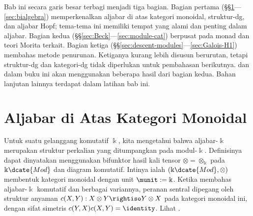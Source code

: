 \begin{petunjukbacaan}
	Bab ini secara garis besar terbagi menjadi tiga bagian. Bagian pertama
(\S\S\ref{sec:alg-in-monoidal-cat}---\ref{sec:bialgebra}) memperkenalkan aljabar
	di atas kategori monoidal, struktur-dg, dan aljabar Hopf; tema-tema ini
	memiliki tempat yang alami dan penting dalam aljabar. Bagian kedua
	(\S\S\ref{sec:Beck}---\ref{sec:module-cat}) berpusat pada monad dan teori
	Morita terkait. Bagian ketiga
	(\S\S\ref{sec:descent-modules}---\ref{sec:Galois-H1}) membahas metode
	penurunan. Ketiganya kurang lebih disusun berurutan, tetapi struktur-dg dan
	kategori-dg tidak diperlukan untuk pembahasan berikutnya. 
	dan  dalam buku ini akan menggunakan beberapa hasil dari
	bagian kedua. Bahan lanjutan lainnya terdapat dalam latihan bab ini.
\end{petunjukbacaan}

\section{Aljabar di Atas Kategori Monoidal}\label{sec:alg-in-monoidal-cat}

Untuk suatu gelanggang komutatif $\Bbbk$, kita mengetahui bahwa aljabar-$\Bbbk$
merupakan struktur perkalian yang ditumpangkan pada modul-$\Bbbk$. Definisinya
dapat dinyatakan menggunakan bifunktor hasil kali tensor
$\otimes=\otimes_{\Bbbk}$ pada $\Bbbk\dcate{Mod}$ dan diagram komutatif.
Intinya ialah $(\Bbbk\dcate{Mod},\otimes)$ membentuk kategori monoidal dengan
unit $\munit:=\Bbbk$. Ketika membahas aljabar-$\Bbbk$ komutatif dan berbagai
variannya, peranan sentral dipegang oleh struktur anyaman
$c(X,Y):X\otimes Y\rightiso Y\otimes X$ pada kategori monoidal ini, dengan
sifat simetris $c(Y,X)c(X,Y)=\identity$. Lihat \cite[\S 7.4]{Li1}.

